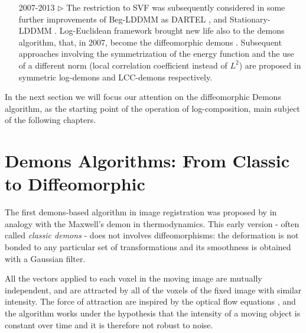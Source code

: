 \begin{enumerate}
	\item[2007-2013 $\triangleright$] The restriction to SVF was subsequently considered in some further improvements of Beg-LDDMM  as DARTEL \cite{Ashburner:07}, and Stationary-LDDMM  \cite{hernandez2007registration}. 
	Log-Euclidean framework brought new life also to the demons algorithm, that, in 2007, become the diffeomorphic demons \cite{vercauteren2007non}.
	Subsequent approaches involving the symmetrization of the energy function and the use of a different norm (local correlation coefficient instead of $L^{2}$) are proposed in symmetric log-demons \cite{vercauteren08} and LCC-demons \cite{lorenzi2013lcc} respectively.
	
\end{enumerate}
\noindent
In the next section we will focus our attention on the diffeomorphic Demons algorithm, as the starting point of the operation of log-composition, main subject of the following chapters.

\section{Demons Algorithms: From Classic to Diffeomorphic}

The first demons-based algorithm in image registration was proposed by \cite{thirion1998image} in analogy with the Maxwell's demon in thermodynamics. This early version - often called \emph{classic demons} - does not involves diffeomorphisms: the deformation is not bonded to any particular set of transformations and its smoothness is obtained with a Gaussian filter.

All the vectors applied to each voxel in the moving image are mutually independent, and are attracted by all of the voxels of the fixed image with similar intensity. The force of attraction are inspired by the optical flow equations \cite{horn1981determining}, and the algorithm works under the hypothesis that the intensity of a moving object is constant over time and it is therefore not robust to noise. 

